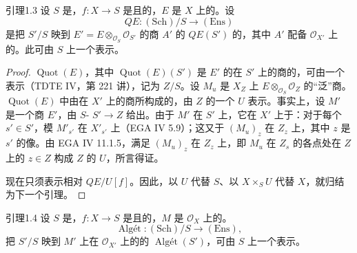 \begin{SGAresult}{引理}{1.3}
设 $S$ 是，$f:X\to S$ 是且的，$E$ 是 $X$ 上的。设
\[
QE:(\mathrm{Sch})/S\longrightarrow(\mathrm{Ens})
\]
是把 $S'/S$ 映到 $E'=E\otimes_{\mathcal O_S}\mathcal O_{S'}$ 的商 $A'$ 的 $QE(S')$ 的，其中 $A'$ 配备 $\mathcal O_{X'}$ 上的。此可由 $S$ 上一个表示。
\end{SGAresult}
\begin{proof}
 $\operatorname{Quot}(E)$，其中 $\operatorname{Quot}(E)(S')$ 是 $E'$ 的在 $S'$ 上的商的，可由一个表示（TDTE IV，第 221 讲），记为 $Z/S$。设 $M_u$ 是 $X_Z$ 上 $E\otimes_{\mathcal O_S}\mathcal O_Z$ 的“泛”商。$\operatorname{Quot}(E)$ 中由在 $X'$ 上的商所构成的，由 $Z$ 的一个 $U$ 表示。事实上，设 $M'$ 是一个商 $E'$，由 $S$- $S'\to Z$ 给出。由于 $M'$ 在 $S'$ 上，它在 $X'$ 上于：对于每个 $s'\in S'$，模 $M'_{s'}$ 在 $X'_{s'}$ 上（EGA IV 5.9）；这又于 $(M_u)_z$ 在 $Z_z$ 上，其中 $z$ 是 $s'$ 的像。由 EGA IV 11.1.5，满足 $(M_u)_z$ 在 $Z_z$ 上，即 $M_u$ 在 $Z_s$ 的各点处在 $Z$ 上的 $z\in Z$ 构成 $Z$ 的 $U$，所言得证。

现在只须表示相对 $QE/U[f]$。因此，以 $U$ 代替 $S$、以 $X\times_S U$ 代替 $X$，就归结为下一个引理。
\end{proof}
\begin{SGAresult}{引理}{1.4}
设 $S$ 是，$f:X\to S$ 是且的，$M$ 是 $\mathcal O_X$ 上的。
\[
\operatorname{Alg\text{é}t}:(\mathrm{Sch})/S\longrightarrow(\mathrm{Ens}),
\]
把 $S'/S$ 映到 $M'$ 上在 $\mathcal O_{X'}$ 上的的 $\operatorname{Alg\text{é}t}(S')$，可由 $S$ 上一个表示。
\end{SGAresult}
